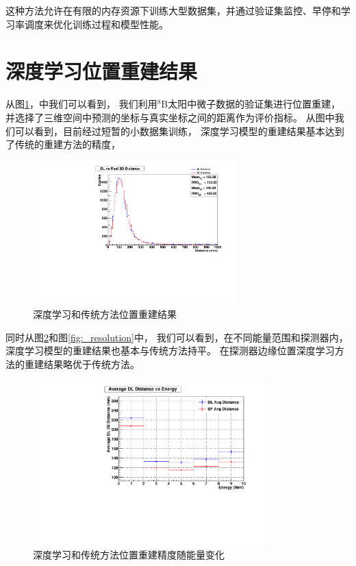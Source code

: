 这种方法允许在有限的内存资源下训练大型数据集，并通过验证集监控、早停和学习率调度来优化训练过程和模型性能。

\section{深度学习位置重建结果}

从图\ref{fig:position_reconstruction}，中我们可以看到，
我们利用${}^{8}$B太阳中微子数据的验证集进行位置重建，
并选择了三维空间中预测的坐标与真实坐标之间的距离作为评价指标。
从图中我们可以看到，目前经过短暂的小数据集训练，
深度学习模型的重建结果基本达到了传统的重建方法的精度，
\begin{figure}[htbp]
    \centering
    \includegraphics[width=0.7\textwidth]{figures/distance_distribution_comp.pdf}
    \caption{深度学习和传统方法位置重建结果}
    \label{fig:position_reconstruction}
\end{figure}
同时从图\ref{fig:energy_resolution}和图\ref{fig:_resolution}中，
我们可以看到，在不同能量范围和探测器内，深度学习模型的重建结果也基本与传统方法持平。
在探测器边缘位置深度学习方法的重建结果略优于传统方法。
\begin{figure}[htbp]
    \centering
    \includegraphics[width=0.8\textwidth]{figures/energy_vs_dist_avg_comp.pdf}
    \caption{深度学习和传统方法位置重建精度随能量变化}
    \label{fig:energy_resolution}
\end{figure}

